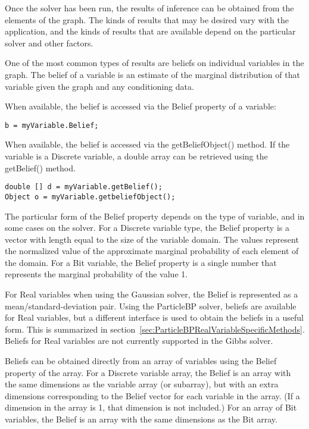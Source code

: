 Once the solver has been run, the results of inference can be obtained from the elements of the graph.  The kinds of results that may be desired vary with the application, and the kinds of results that are available depend on the particular solver and other factors.

One of the most common types of results are beliefs on individual variables in the graph.  The belief of a variable is an estimate of the marginal distribution of that variable given the graph and any conditioning data.  

\ifmatlab

When available, the belief is accessed via the Belief property of a variable:

\begin{lstlisting}
b = myVariable.Belief;
\end{lstlisting}
\fi

\ifjava

When available, the belief is accessed via the getBeliefObject() method.  If the variable is a Discrete variable, a double array can be retrieved using the getBelief() method.

\begin{lstlisting}
double [] d = myVariable.getBelief();
Object o = myVariable.getbeliefObject();
\end{lstlisting}
\fi

The particular form of the Belief property depends on the type of variable, and in some cases on the solver.  For a Discrete variable type, the Belief property is a vector with length equal to the size of the variable domain.  The values represent the normalized value of the approximate marginal probability of each element of the domain.  For a Bit variable, the Belief property is a single number that represents the marginal probability of the value 1.

For Real variables when using the Gaussian solver, the Belief is represented as a mean/standard-deviation pair.  Using the ParticleBP solver, beliefs are available for Real variables, but a different interface is used to obtain the beliefs in a useful form.  This is summarized in section~\ref{sec:ParticleBPRealVariableSpecificMethods}.  Beliefs for Real variables are not currently supported in the Gibbs solver.

Beliefs can be obtained directly from an array of variables using the Belief property of the array.  For a Discrete variable array, the Belief is an array with the same dimensions as the variable array (or subarray), but with an extra dimensions corresponding to the Belief vector for each variable in the array.  (If a dimension in the array is 1, that dimension is not included.)  For an array of Bit variables, the Belief is an array with the same dimensions as the Bit array.

